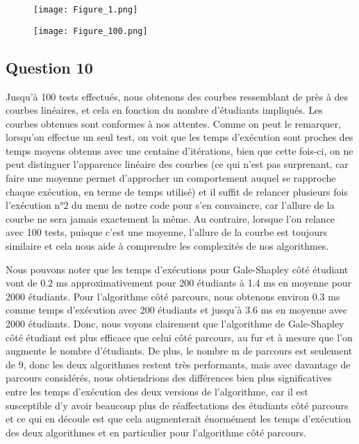\documentclass[a4paper,11pt]{article}
\begin{document}
\begin{figure}[h]
  \centering
  \texttt{[image: Figure\_1.png]}
  \label{fig:figure_1}
  
\end{figure}

\begin{figure}[h]

  \centering
  \texttt{[image: Figure\_100.png]}
  \label{fig:figure_100}
  
\end{figure}

\subsection*{Question 10}

Jusqu'à 100 tests effectués, nous obtenons des courbes ressemblant de près à des courbes linéaires, et cela en fonction du nombre d'étudiants impliqués. Les courbes obtenues sont conformes à nos attentes. Comme on peut le remarquer, lorsqu'on effectue un seul test, on voit que les temps d'exécution sont proches des temps moyens obtenus avec une centaine d'itérations, bien que cette fois-ci, on ne peut distinguer l'apparence linéaire des courbes (ce qui n'est pas surprenant, car faire une moyenne permet d'approcher un comportement auquel se rapproche chaque exécution, en terme de temps utilisé) et il suffit de relancer plusieurs fois l'exécution n°2 du menu de notre code pour s'en convaincre, car l'allure de la courbe ne sera jamais exactement la même. Au contraire, lorsque l'on relance avec 100 tests, puisque c'est une moyenne, l'allure de la courbe est toujours similaire et cela nous aide à comprendre les complexités de nos algorithmes.

Nous pouvons noter que les temps d'exécutions pour Gale-Shapley côté étudiant vont de 0.2 ms approximativement pour 200 étudiants à 1.4 ms en moyenne pour 2000 étudiants. Pour l'algorithme côté parcours, nous obtenons environ 0.3 ms comme temps d'exécution avec 200 étudiants et jusqu'à 3.6 ms en moyenne avec 2000 étudiants. Donc, nous voyons clairement que l'algorithme de Gale-Shapley côté étudiant est plus efficace que celui côté parcours, au fur et à mesure que l'on augmente le nombre d'étudiants. De plus, le nombre m de parcours est seulement de 9, donc les deux algorithmes restent très performants, mais avec davantage de parcours considérés, nous obtiendrions des différences bien plus significatives entre les temps d'exécution des deux versions de l'algorithme, car il est susceptible d'y avoir beaucoup plus de réaffectations des étudiants côté parcours et ce qui en découle est que cela augmenterait énormément les temps d'exécution des deux algorithmes et en particulier pour l'algorithme côté parcours.
\end{document}

